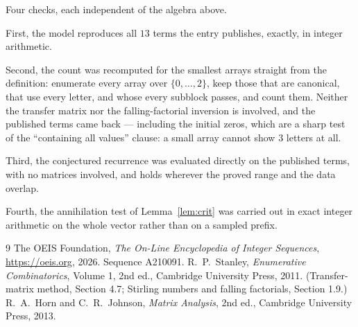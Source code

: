 \documentclass[11pt,a4paper]{article}
\theoremstyle{plain}
\theoremstyle{definition}
\begin{document}
Four checks, each independent of the algebra above.

First, the model reproduces all $13$ terms the entry publishes, exactly, in integer
arithmetic.

Second, the count was recomputed for the smallest arrays straight from the definition:
enumerate every array over $\{0,\dots,2\}$, keep those that are canonical, that use every
letter, and whose every subblock passes, and count them. Neither the transfer matrix nor the
falling-factorial inversion is involved, and the published terms came back --- including the
initial zeros, which are a sharp test of the ``containing all values'' clause: a small array
cannot show $3$ letters at all.

Third, the conjectured recurrence was evaluated directly on the published terms, with no
matrices involved, and holds wherever the proved range and the data overlap.

Fourth, the annihilation test of Lemma~\ref{lem:crit} was carried out in exact integer
arithmetic on the whole vector rather than on a sampled prefix.

\begin{thebibliography}{9}
 The OEIS Foundation, \emph{The On-Line Encyclopedia of Integer
Sequences}, \url{https://oeis.org}, 2026. Sequence A210091.
 R.~P.~Stanley, \emph{Enumerative Combinatorics}, Volume 1, 2nd ed.,
Cambridge University Press, 2011. (Transfer-matrix method, Section 4.7; Stirling numbers and
falling factorials, Section 1.9.)
 R.~A.~Horn and C.~R.~Johnson, \emph{Matrix Analysis}, 2nd ed., Cambridge
University Press, 2013.
\end{thebibliography}
\end{document}
